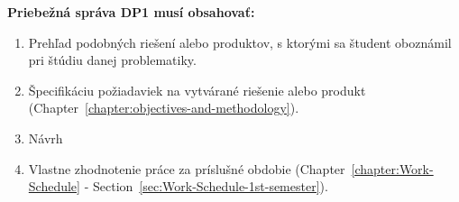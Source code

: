 \newpage
\textbf{Priebežná správa DP1 musí obsahovať:}
\begin{enumerate}
    \item Prehľad podobných riešení alebo produktov, s ktorými sa študent oboznámil pri štúdiu danej problematiky.
    \item Špecifikáciu požiadaviek na vytvárané riešenie alebo produkt
            (Chapter~\ref{chapter:objectives-and-methodology}).
    \item Návrh
    \item Vlastne zhodnotenie práce za príslušné obdobie 
            (Chapter~\ref{chapter:Work-Schedule} - 
            Section~\ref{sec:Work-Schedule-1st-semester}).
\end{enumerate}

